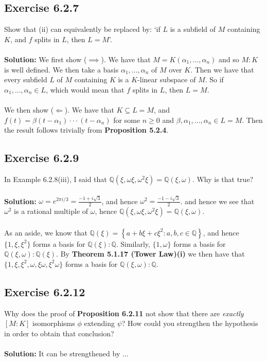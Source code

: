 \documentclass{article}
\begin{document}
\subsection*{Exercise 6.2.7}
Show that (ii) can equivalently be replaced by: `if $L$ is a subfield of $M$
containing $K$, and $f$ splits in $L$, then $L=M$'.
\\\\
\textbf{Solution:}
We first show ($\implies$). We have that $M= K(\alpha_1,...,\alpha_n)$ and so $M:K$ is well defined.
We then take a basis $\alpha_1,...,\alpha_n$ of $M$ over $K$. Then we have that every subfield $L$ of $M$
containing $K$ is a $K$-linear subspace of $M$. So if $\alpha_1,...,\alpha_n \in L$, which would mean that $f$ splits in $L$,
then $L=M$.
\\\\
We then show ($\Longleftarrow$). We have that $K \subseteq L = M$, and $f(t)=\beta(t-\alpha_1)\cdot\cdot\cdot(t-\alpha_n)$
for some $n \ge 0$ and $\beta, \alpha_1,...,\alpha_n \in L=M$. Then the result follows trivially from \textbf{Proposition 5.2.4}. 

\subsection*{Exercise 6.2.9}
In Example 6.2.8(iii), I said that $\mathbb{Q}(\xi, \omega\xi, \omega^2\xi) = \mathbb{Q}(\xi,\omega)$.
Why is that true?
\\\\
\textbf{Solution:}
$\omega=e^{2\pi i /3} = \frac{-1+i\sqrt{3}}{2}$, and hence $\omega^2 = \frac{-1-i\sqrt{3}}{2}$. and hence we see that $\omega^2$ is a rational multiple
of $\omega$, hence $\mathbb{Q}(\xi, \omega\xi, \omega^2\xi) = \mathbb{Q}(\xi,\omega)$.
\\\\
As an aside, we know that $\mathbb{Q}(\xi)= \left\{a + b\xi + c\xi^2: a,b,c \in \mathbb{Q} \right\}$, and hence $\{1, \xi, \xi^2\}$
forms a basis for $\mathbb{Q}(\xi):\mathbb{Q}$. Similarly, $\{1, \omega\}$ forms a basis for $\mathbb{Q}(\xi, \omega): \mathbb{Q}(\xi)$.
By \textbf{Theorem 5.1.17 (Tower Law)(i)} we then have that $\{1, \xi, \xi^2, \omega, \xi\omega, \xi^2\omega\}$ forms a basis for $\mathbb{Q}(\xi, \omega):\mathbb{Q}$.

\subsection*{Exercise 6.2.12}
Why does the proof of \textbf{Proposition 6.2.11} not show that there are \emph{exactly} $[M:K]$ isomorphisms $\phi$ extending $\psi$?
How could you strengthen the hypothesis in order to obtain that conclusion?
\\\\
\textbf{Solution:}
It can be strengthened by ...
\end{document}
